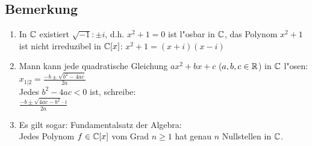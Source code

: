 \subsection{Bemerkung}
\begin{enumerate}
	\item
	In $\mathbb{C}$ existiert $\sqrt{-1}: \pm i$, d.h. $x^2+1=0$ ist l"osbar in $\mathbb{C}$, das Polynom $x^2+1$ ist nicht irreduzibel in $\mathbb{C}[x]$: $ x^2+1 = (x+i)(x-i)$
	\item
	Mann kann jede quadratische Gleichung $ax^2+bx+c$ ($a,b,c\in \mathbb{R}$) in $\mathbb{C}$ l"osen:\\
	$x_{1|2} = \frac{-b \pm \sqrt{b^2-4ac}}{2a}$\\
	Jedes $b^2-4ac < 0$ ist, schreibe:\\
	$\frac{-b \pm \sqrt{4ac-b^2}\cdot i}{2a}$
	\item
	Es gilt sogar: Fundamentalsatz der Algebra:\\
	Jedes Polynom $f\in \mathbb{C}[x]$ vom Grad $n\geq 1$ hat genau $n$ Nullstellen in $\mathbb{C}$. 
\end{enumerate}